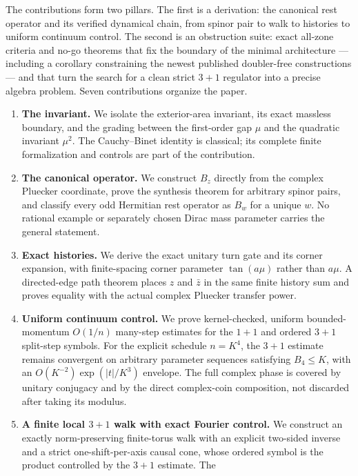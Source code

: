 \documentclass[11pt]{article}
\begin{document}
The contributions form two pillars.  The first is a derivation: the
canonical rest operator and its verified dynamical chain, from spinor pair
to walk to histories to uniform continuum control.  The second is an
obstruction suite: exact all-zone criteria and no-go theorems that fix the
boundary of the minimal architecture --- including a corollary constraining
the newest published doubler-free constructions --- and that turn the search
for a clean strict $3+1$ regulator into a precise algebra problem.  Seven
contributions organize the paper.
\begin{enumerate}[leftmargin=2em]
  \item \textbf{The invariant.}  We isolate the exterior-area invariant, its
  exact massless boundary, and the grading between the first-order gap $\mu$
  and the quadratic invariant $\mu^2$.  The Cauchy--Binet identity is
  classical; its complete finite formalization and controls are part of the
  contribution.
  \item \textbf{The canonical operator.}  We construct $B_z$ directly from the
  complex Pluecker coordinate, prove the synthesis theorem for arbitrary
  spinor pairs, and classify every odd Hermitian rest operator as $B_w$ for a
  unique $w$.  No rational example or separately chosen Dirac mass parameter
  carries the general statement.
  \item \textbf{Exact histories.}  We derive the exact unitary turn gate and
  its corner expansion, with finite-spacing corner parameter $\tan(a\mu)$
  rather than $a\mu$.  A directed-edge path theorem places $z$ and $\bar z$ in
  the same finite history sum and proves equality with the actual complex
  Pluecker transfer power.
  \item \textbf{Uniform continuum control.}  We prove kernel-checked, uniform
  bounded-momentum $O(1/n)$ many-step estimates for the $1+1$ and ordered
  $3+1$ split-step symbols.  For the explicit schedule $n=K^4$, the $3+1$
  estimate remains convergent on arbitrary parameter sequences satisfying
  $B_4\leq K$, with an $O(K^{-2})\exp(|t|/K^3)$ envelope.  The full complex phase is covered by unitary
  conjugacy and by the direct complex-coin composition, not discarded after
  taking its modulus.
  \item \textbf{A finite local $3+1$ walk with exact Fourier control.}  We
  construct an exactly norm-preserving finite-torus walk with an explicit
  two-sided inverse and a strict one-shift-per-axis causal cone, whose ordered
  symbol is the product controlled by the $3+1$ estimate.  The

\end{enumerate}
\end{document}
